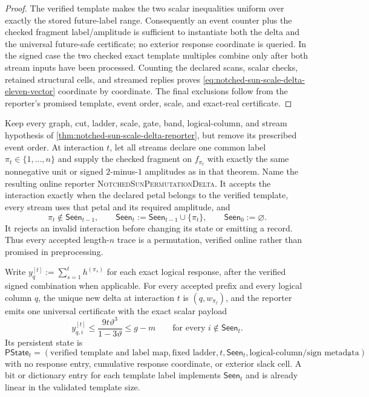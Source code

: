 \begin{proof}
The verified template makes the two scalar inequalities uniform over exactly
the stored future-label range.  Consequently an event counter plus the
checked fragment label/amplitude is sufficient to instantiate both the delta
and the universal future-safe certificate; no exterior response coordinate
is queried.  In the signed case the two checked exact template multiples
combine only after both stream inputs have been processed.  Counting the
declared scans, scalar checks, retained structural cells, and streamed replies
proves \cref{eq:notched-sun-scale-delta-eleven-vector} coordinate by
coordinate.  The final exclusions follow from the reporter's promised
template, event order, scale, and exact-real certificate.
\end{proof}

\begin{theorem}
\label{thm:notched-sun-permutation-delta-reporter}
Keep every graph, cut, ladder, scale, gate, band, logical-column, and stream
hypothesis of \cref{thm:notched-sun-scale-delta-reporter}, but remove its
prescribed event order.  At interaction $t$, let all streams declare one
common label $\pi_t\in\{1,\ldots,n\}$ and supply the checked fragment on
$f_{\pi_t}$ with exactly the same nonnegative unit or signed $2$-minus-$1$
amplitudes as in that theorem.  Name the resulting online reporter
\textsc{NotchedSunPermutationDelta}.  It accepts the interaction exactly
when the declared petal belongs to the verified template, every stream uses
that petal and its required amplitude, and
\begin{equation}
 \pi_t\notin\mathsf{Seen}_{t-1},
 \qquad
 \mathsf{Seen}_t:=\mathsf{Seen}_{t-1}\cup\{\pi_t\},
 \qquad
 \mathsf{Seen}_0:=\varnothing.
 \label{eq:notched-sun-permutation-prefix}
\end{equation}
It rejects an invalid interaction before changing its state or emitting a
record.  Thus every accepted length-$n$ trace is a permutation, verified
online rather than promised in preprocessing.

Write
$y_q^{[t]}:=\sum_{s=1}^t h^{(\pi_s)}$ for each exact logical response, after
the verified signed combination when applicable.  For every accepted prefix
and every logical column $q$, the unique new delta at interaction $t$ is
$(q,w_{\pi_t})$, and the reporter emits one universal certificate with the
exact scalar payload
\begin{equation}
 y_{q,i}^{[t]}
 \leq \frac{9t\vartheta^3}{1-3\vartheta}
 \leq g-m
 \qquad
 \text{for every }i\notin\mathsf{Seen}_t.
 \label{eq:notched-sun-permutation-certificate}
\end{equation}
Its persistent state is
\begin{equation}
 \mathsf{PState}_t
 =(
   \text{verified template and label map},\text{fixed ladder},t,
   \mathsf{Seen}_t,\text{logical-column/sign metadata}),
 \label{eq:notched-sun-permutation-state}
\end{equation}
with no response entry, cumulative response coordinate, or exterior slack
cell.  A bit or dictionary entry for each template label implements
$\mathsf{Seen}_t$ and is already linear in the validated template size.


\end{theorem}
